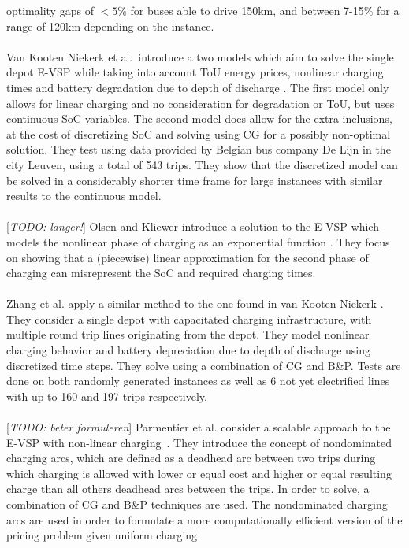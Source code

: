 \documentclass[]{article}
\newcommand{\todo}[1]{{\color{red}[\textit{TODO: #1}]}}
\begin{document}
optimality gaps of $<5\%$ for buses able to drive 150km, and between 7-15\%
for a range of 120km depending on the instance. \\\\
Van Kooten Niekerk et al.\ introduce a two models which aim to solve the single depot E-VSP
while taking into account ToU energy prices, nonlinear charging times and
battery degradation due to depth of discharge \citet{vanKootenNiekerk2017}. The first model only allows for linear charging and no consideration for degradation or ToU, but uses continuous SoC variables. The second model does allow for the extra inclusions, at the cost of discretizing SoC and solving using CG for a possibly non-optimal solution. They test using data provided
by Belgian bus company De Lijn in the city Leuven, using a total of 543 trips. They show that the
discretized model can be solved in a considerably shorter time frame for large instances with similar results to
the continuous model. \\\\
\todo{langer!}
Olsen and Kliewer introduce a solution to the E-VSP which models the nonlinear phase of charging as an exponential function \citet{Olsen2020}. They focus on showing that a (piecewise) linear approximation for the second phase of charging can
misrepresent the SoC and required charging times. \\\\
Zhang et al. apply a similar method to the one found in van Kooten Niekerk
\citet{Zhang2021}. They consider a single depot with capacitated charging infrastructure,
with multiple round trip lines originating from the depot. They model
nonlinear charging behavior and battery depreciation due to depth of discharge using discretized time steps. They solve
using a combination of CG and B\&P. Tests are done on both randomly generated
instances as well as 6 not yet electrified lines with up to 160 and 197 trips
respectively.\\\\
\todo{beter formuleren}
Parmentier et al. consider a scalable approach to the E-VSP with non-linear charging~\citet{Parmentier2023}. They introduce the concept of nondominated charging arcs, which are defined as a deadhead arc between two trips during which charging is allowed with lower or equal cost and higher or equal resulting charge than all others deadhead arcs between the trips. In order to solve, a combination of CG and B\&P techniques are used. The nondominated charging arcs are used in order to formulate a more
computationally efficient version of the pricing problem given uniform charging
\end{document}
